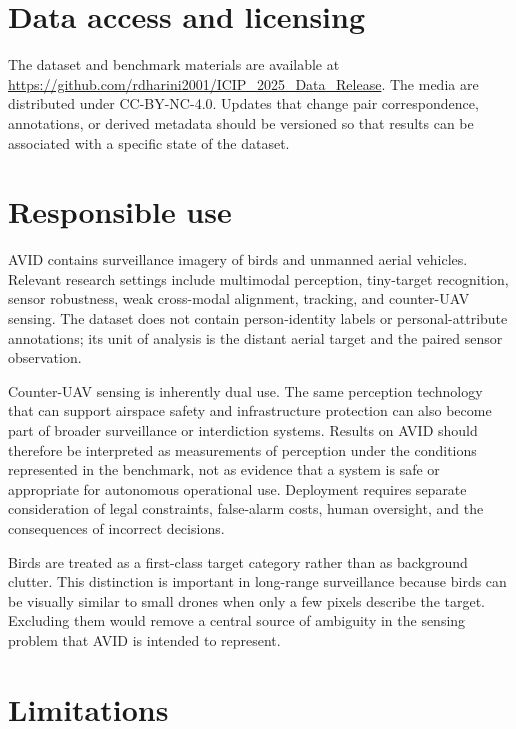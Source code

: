 \documentclass[10pt]{article}
\newcommand{\dataset}{\textsc{AVID}}
\begin{document}
\section{Data access and licensing}
\label{sec:repro}

The dataset and benchmark materials are available at
\url{https://github.com/rdharini2001/ICIP_2025_Data_Release}.
The media are distributed under CC-BY-NC-4.0. Updates that change pair correspondence, annotations, or derived metadata should be versioned so that results can be associated with a specific state of the dataset.


\section{Responsible use}
\label{sec:responsible}

\dataset{} contains surveillance imagery of birds and unmanned aerial vehicles. Relevant research settings include multimodal perception, tiny-target recognition, sensor robustness, weak cross-modal alignment, tracking, and counter-UAV sensing. The dataset does not contain person-identity labels or personal-attribute annotations; its unit of analysis is the distant aerial target and the paired sensor observation.

Counter-UAV sensing is inherently dual use. The same perception technology that can support airspace safety and infrastructure protection can also become part of broader surveillance or interdiction systems. Results on \dataset{} should therefore be interpreted as measurements of perception under the conditions represented in the benchmark, not as evidence that a system is safe or appropriate for autonomous operational use. Deployment requires separate consideration of legal constraints, false-alarm costs, human oversight, and the consequences of incorrect decisions.

Birds are treated as a first-class target category rather than as background clutter. This distinction is important in long-range surveillance because birds can be visually similar to small drones when only a few pixels describe the target. Excluding them would remove a central source of ambiguity in the sensing problem that \dataset{} is intended to represent.


\section{Limitations}
\label{sec:limitations}
\end{document}
